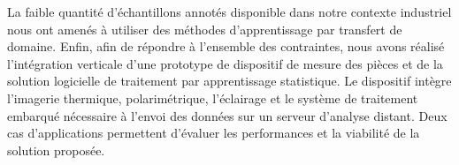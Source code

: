 {La faible quantité d'échantillons annotés disponible dans notre contexte industriel nous ont amenés à utiliser des méthodes d'apprentissage par transfert de domaine.
Enfin, afin de répondre à l'ensemble des contraintes, nous avons réalisé l'intégration verticale d'une prototype de dispositif de mesure des pièces et de la solution logicielle de traitement par apprentissage statistique.
Le dispositif intègre l'imagerie thermique, polarimétrique, l'éclairage et le système de traitement embarqué nécessaire à l'envoi des données sur un serveur d'analyse distant.
Deux cas d'applications permettent d'évaluer les performances et la viabilité de la solution proposée.
}


